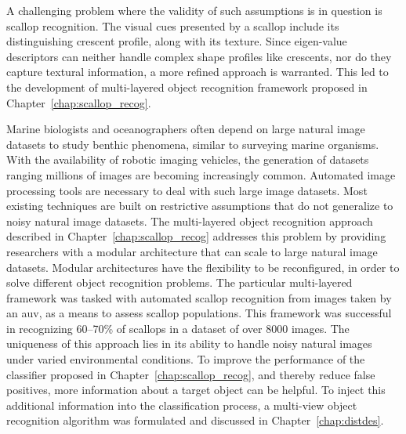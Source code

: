 A challenging problem where the validity of such assumptions is in question is scallop recognition.
The visual cues presented by a scallop include its distinguishing crescent profile, along with its texture.
Since eigen-value descriptors can neither handle complex shape profiles like crescents, nor do they capture textural information,
a more refined approach is warranted.
This led to the development of multi-layered object recognition framework proposed in Chapter~\ref{chap:scallop_recog}.

Marine biologists and oceanographers often depend on large natural image datasets to study benthic phenomena, similar to surveying marine organisms. With the availability of robotic imaging vehicles, the generation of datasets ranging millions of images are becoming increasingly common. Automated image processing tools are necessary to deal with such large image datasets. Most existing techniques are built on restrictive assumptions that do not generalize to noisy natural image datasets. The multi-layered object recognition approach described in Chapter~\ref{chap:scallop_recog} addresses this problem by providing researchers with a modular architecture that can scale to large natural image datasets. Modular architectures have the flexibility to be reconfigured, in order to solve different object recognition problems.
The particular multi-layered framework was tasked with automated scallop recognition from images taken by an \gls{auv}, as a means to assess scallop populations. 
This framework was successful in recognizing 60--70\% of scallops in a dataset of over 8000 images.
The uniqueness of this approach lies in its ability to handle noisy natural images under varied environmental conditions.
To improve the performance of the classifier proposed in Chapter~\ref{chap:scallop_recog}, and thereby reduce false positives, more information about a target object can be helpful.
To inject this additional information into the classification process, a multi-view object recognition algorithm was formulated and discussed in Chapter~\ref{chap:distdes}.

